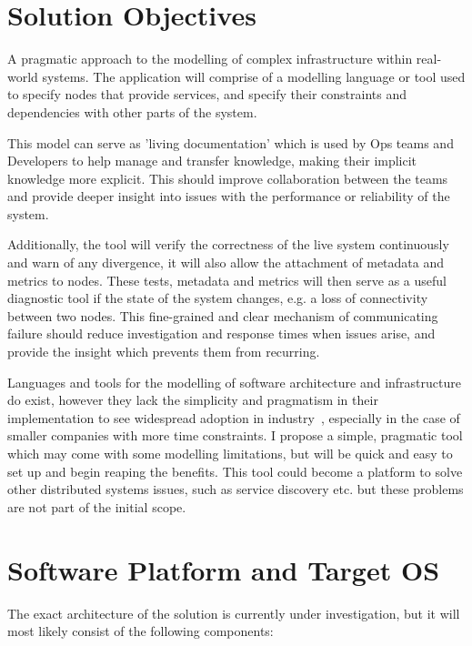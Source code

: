 \documentclass{cshonours}
\begin{document}
\section{Solution Objectives}

A pragmatic approach to the modelling of complex infrastructure within real-world systems. The application will comprise of a modelling language or tool used to specify nodes that provide services, and specify their constraints and dependencies with other parts of the system.

This model can serve as 'living documentation' which is used by Ops teams and Developers to help manage and transfer knowledge, making their implicit knowledge more explicit. This should improve collaboration between the teams and provide deeper insight into issues with the performance or reliability of the system.

Additionally, the tool will verify the correctness of the live system continuously and warn of any divergence, it will also allow the attachment of metadata and metrics to nodes. These tests, metadata and metrics will then serve as a useful diagnostic tool if the state of the system changes, e.g. a loss of connectivity between two nodes. This fine-grained and clear mechanism of communicating failure should reduce investigation and response times when issues arise, and provide the insight which prevents them from recurring.

Languages and tools for the modelling of software architecture and infrastructure do exist, however they lack the simplicity and pragmatism in their implementation to see widespread adoption in industry~\cite{ModellingAdoption}, especially in the case of smaller companies with more time constraints. I propose a simple, pragmatic tool which may come with some modelling limitations, but will be quick and easy to set up and begin reaping the benefits. This tool could become a platform to solve other distributed systems issues, such as service discovery etc. but these problems are not part of the initial scope.

\section{Software Platform and Target OS}

The exact architecture of the solution is currently under investigation, but it will most likely consist of the following components:
\end{document}
